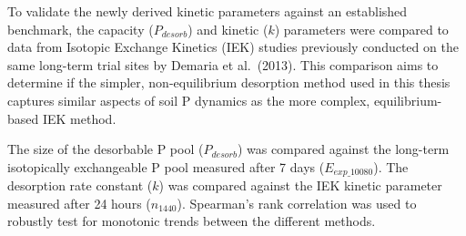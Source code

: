 \documentclass[
  a4paper,
]{article}
\begin{document}
To validate the newly derived kinetic parameters against an established
benchmark, the capacity (\(P_{desorb}\)) and kinetic (\(k\)) parameters
were compared to data from Isotopic Exchange Kinetics (IEK) studies
previously conducted on the same long-term trial sites by Demaria et
al.~(2013). This comparison aims to determine if the simpler,
non-equilibrium desorption method used in this thesis captures similar
aspects of soil P dynamics as the more complex, equilibrium-based IEK
method.

The size of the desorbable P pool (\(P_{desorb}\)) was compared against
the long-term isotopically exchangeable P pool measured after 7 days
(\(E_{exp\_10080}\)). The desorption rate constant (\(k\)) was compared
against the IEK kinetic parameter measured after 24 hours
(\(n_{1440}\)). Spearman's rank correlation was used to robustly test
for monotonic trends between the different methods.
\end{document}
